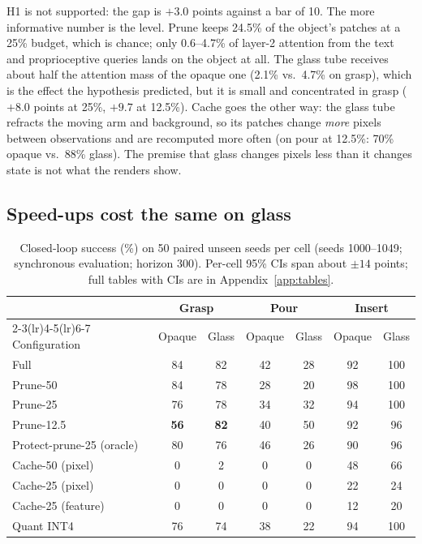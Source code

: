 \documentclass[11pt]{article}
\begin{document}
H1 is not supported: the gap is $+3.0$ points against a bar of 10. The more informative number is the level. Prune keeps 24.5\% of the object's patches at a 25\% budget, which is chance; only 0.6--4.7\% of layer-2 attention from the text and proprioceptive queries lands on the object at all. The glass tube receives about half the attention mass of the opaque one (2.1\% vs.\ 4.7\% on grasp), which is the effect the hypothesis predicted, but it is small and concentrated in grasp ($+8.0$ points at 25\%, $+9.7$ at 12.5\%). Cache goes the other way: the glass tube refracts the moving arm and background, so its patches change \emph{more} pixels between observations and are recomputed more often (on pour at 12.5\%: 70\% opaque vs.\ 88\% glass). The premise that glass changes pixels less than it changes state is not what the renders show.

\subsection{Speed-ups cost the same on glass}
\label{sec:matrix}

\begin{table}[t]
\centering
\small
\begin{tabular}{lcccccc}
\toprule
& \multicolumn{2}{c}{Grasp} & \multicolumn{2}{c}{Pour} & \multicolumn{2}{c}{Insert} \\
\cmidrule(lr){2-3}\cmidrule(lr){4-5}\cmidrule(lr){6-7}
Configuration & Opaque & Glass & Opaque & Glass & Opaque & Glass \\
\midrule
Full & 84 & 82 & 42 & 28 & 92 & 100 \\
Prune-50 & 84 & 78 & 28 & 20 & 98 & 100 \\
Prune-25 & 76 & 78 & 34 & 32 & 94 & 100 \\
Prune-12.5 & \textbf{56} & \textbf{82} & 40 & 50 & 92 & 96 \\
Protect-prune-25 (oracle) & 80 & 76 & 46 & 26 & 90 & 96 \\
Cache-50 (pixel) & 0 & 2 & 0 & 0 & 48 & 66 \\
Cache-25 (pixel) & 0 & 0 & 0 & 0 & 22 & 24 \\
Cache-25 (feature) & 0 & 0 & 0 & 0 & 12 & 20 \\
Quant INT4 & 76 & 74 & 38 & 22 & 94 & 100 \\
\bottomrule
\end{tabular}
\caption{Closed-loop success (\%) on 50 paired unseen seeds per cell (seeds 1000--1049; synchronous evaluation; horizon 300). Per-cell 95\% CIs span about $\pm 14$ points; full tables with CIs are in Appendix~\ref{app:tables}.}
\label{tab:matrix}
\end{table}
\end{document}

